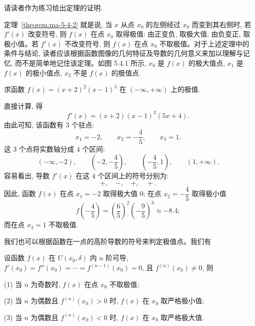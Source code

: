 请读者作为练习给出定理的证明.

定理~\ref{theorem:ma-5-4-2} 就是说, 当 $x$ 从点 $x_0$ 的左侧经过 $x_0$ 而变到其右侧时, 若 $f'(x)$ 改变符号, 则 $f(x)$ 在点 $x_0$ 取得极值: 由正变负, 取极大值; 由负变正, 取极小值。若 $f'(x)$ 不改变符号, 则 $f(x)$ 在点 $x_0$ 不取极值。对于上述定理中的条件与结论, 读者应该根据函数图像的几何特征及导数的几何意义来加以理解与记忆, 而不是简单地记住该定理。如图 5.4.1 所示, $x_0$ 是 $f(x)$ 的极大值点, $x_1$ 是 $f(x)$ 的极小值点, $x_2$ 不是 $f(x)$ 的极值点.

\begin{example}\label{example:ma-5-4-3}
求函数 $f(x)=(x+2)^2(x-1)^3$ 在 $(-\infty,+\infty)$ 上的极值.
\end{example}


\begin{solve}
直接计算, 得
\[
  f'(x)=(x+2)(x-1)^2(5x+4).
\]
由此可知, 该函数有 $3$ 个驻点:
\[
  x_1=-2,\qquad x_2=-\frac45,\qquad x_3=1.
\]
这 $3$ 个点将实数轴分成 $4$ 个区间:
\[
  (-\infty,-2),\qquad \left(-2,-\frac45\right),\qquad
  \left(-\frac45,1\right),\qquad (1,+\infty).
\]
容易看出, 导数 $f'(x)$ 在这 $4$ 个区间上的符号分别为:
\[
  +,\quad -,\quad +,\quad +.
\]
因此, 函数 $f(x)$ 在点 $x_1=-2$ 取得极大值 $0$; 在点 $x_2=-\dfrac45$ 取得极小值
\[
  f\left(-\frac45\right)=\left(\frac65\right)^2\left(-\frac95\right)^3\approx -8.4;
\]
而在点 $x_3=1$ 不取极值.

我们也可以根据函数在一点的高阶导数的符号来判定极值点。我们有
\end{solve}


\begin{theorem}\label{theorem:ma-5-4-3}
设函数 $f(x)$ 在 $U(x_0,\delta)$ 内 $n$ 阶可导, $f'(x_0)=f''(x_0)=\cdots=f^{(n-1)}(x_0)=0$, 且 $f^{(n)}(x_0)\ne0$, 则

(1) 当 $n$ 为奇数时, $f(x)$ 在点 $x_0$ 不取极值;

(2) 当 $n$ 为偶数且 $f^{(n)}(x_0)>0$ 时, $f(x)$ 在 $x_0$ 取严格极小值;

(3) 当 $n$ 为偶数且 $f^{(n)}(x_0)<0$ 时, $f(x)$ 在 $x_0$ 取严格极大值.
\end{theorem}


